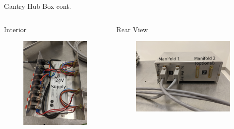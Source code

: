 \documentclass[english,aspectratio=43,8pt]{beamer}
\begin{document}
\begin{frame}{Gantry Hub Box cont.}
  \begin{columns}
  \begin{column}{0.5\textwidth}
    {\large Interior}
    \begin{figure}
        \includegraphics[width=\textwidth]{figures/gantry_hub_interior.jpg}
    \end{figure}
  \end{column}
  \begin{column}{0.5\textwidth}
    {\large Rear View}
    \begin{figure}
        \includegraphics[width=\textwidth]{figures/gantry_hub_rear.jpg}

\end{figure}
\end{column}
\end{columns}
\end{frame}
\end{document}
